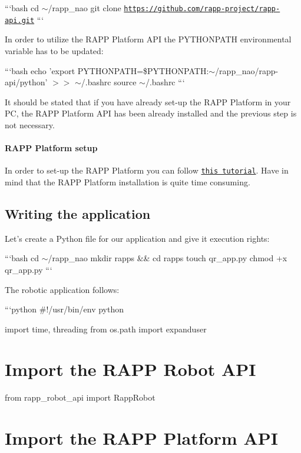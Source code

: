 ```bash cd $\sim$/rapp\-\_\-nao git clone \href{https://github.com/rapp-project/rapp-api.git}{\tt https\-://github.\-com/rapp-\/project/rapp-\/api.\-git} ```

In order to utilize the R\-A\-P\-P Platform A\-P\-I the P\-Y\-T\-H\-O\-N\-P\-A\-T\-H environmental variable has to be updated\-:

```bash echo 'export P\-Y\-T\-H\-O\-N\-P\-A\-T\-H=\$\-P\-Y\-T\-H\-O\-N\-P\-A\-T\-H\-:$\sim$/rapp\-\_\-nao/rapp-\/api/python' $>$$>$ $\sim$/.bashrc source $\sim$/.bashrc ```

It should be stated that if you have already set-\/up the R\-A\-P\-P Platform in your P\-C, the R\-A\-P\-P Platform A\-P\-I has been already installed and the previous step is not necessary.

\paragraph*{R\-A\-P\-P Platform setup}

In order to set-\/up the R\-A\-P\-P Platform you can follow \href{https://github.com/rapp-project/rapp-platform/wiki/How-can-I-set-up-the-RAPP-Platform-in-my-PC%3F}{\tt this tutorial}. Have in mind that the R\-A\-P\-P Platform installation is quite time consuming.

\subsection*{Writing the application}

Let's create a Python file for our application and give it execution rights\-:

```bash cd $\sim$/rapp\-\_\-nao mkdir rapps \&\& cd rapps touch qr\-\_\-app.\-py chmod +x qr\-\_\-app.\-py ```

The robotic application follows\-:

```python \#!/usr/bin/env python

import time, threading from os.\-path import expanduser

\section*{Import the R\-A\-P\-P Robot A\-P\-I}

from rapp\-\_\-robot\-\_\-api import Rapp\-Robot \section*{Import the R\-A\-P\-P Platform A\-P\-I}

